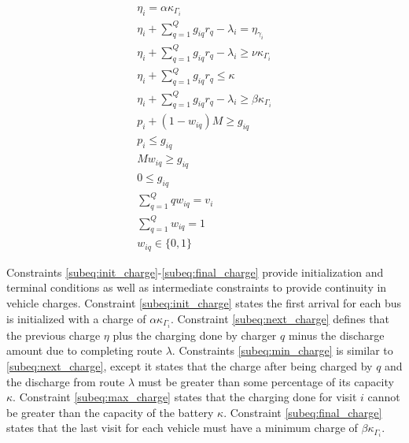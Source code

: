 \documentclass[letterpaper, 10pt, conference]{IEEEtran}
\begin{document}
\begin{subequations}
\label{eq:dynconstrs}
\begin{align}
    \eta_i = \alpha \kappa_{\Gamma_i}                                         \label{subeq:init_charge}  \\
    \eta_i + \sum_{q=1}^Q g_{iq} r_q - \lambda_i = \eta_{\gamma_i}            \label{subeq:next_charge}  \\
    \eta_i + \sum_{q=1}^Q g_{iq} r_q - \lambda_i \geq \nu \kappa_{\Gamma_i}   \label{subeq:min_charge}   \\
    \eta_i + \sum_{q=1}^Q g_{iq} r_q \leq \kappa                              \label{subeq:max_charge}   \\
    \eta_i + \sum_{q=1}^Q g_{iq} r_q - \lambda_i \geq \beta \kappa_{\Gamma_i} \label{subeq:final_charge} \\
    p_i + (1 - w_{iq})M \geq g_{iq}                                           \label{subeq:gpgret}       \\
    p_i \leq g_{iq}                                                           \label{subeq:gples}        \\
    Mw_{iq} \geq g_{iq}                                                       \label{subeq:gwgret}       \\
    0 \leq g_{iq}                                                             \label{subeq:gwles}        \\
    \sum_{q=1}^Q qw_{iq} = v_i                                                \label{subeq:wmax}         \\
    \sum_{q=1}^Q w_{iq} = 1                                                   \label{subeq:wone}         \\
    w_{iq} \in \{0,1\}                                                        \label{subeq:wspace}
\end{align}
\end{subequations}

Constraints \eqref{subeq:init_charge}-\eqref{subeq:final_charge} provide initialization and terminal conditions as well as intermediate constraints to provide continuity in vehicle charges. Constraint \eqref{subeq:init_charge} states the first arrival for each bus is initialized with a charge of \(\alpha \kappa_{\Gamma_i}\). Constraint \eqref{subeq:next_charge} defines that the previous charge \(\eta\) plus the charging done by charger \(q\) minus the discharge amount due to completing route \(\lambda\). Constraints \eqref{subeq:min_charge} is similar to \eqref{subeq:next_charge}, except it states that the charge after being charged by \(q\) and the discharge from route \(\lambda\) must be greater than some percentage of its capacity \(\kappa\). Constraint \eqref{subeq:max_charge} states that the charging done for visit \(i\) cannot be greater than the capacity of the battery \(\kappa\). Constraint \eqref{subeq:final_charge} states that the last visit for each vehicle must have a minimum charge of \(\beta \kappa_{\Gamma_i}\).
\end{document}

